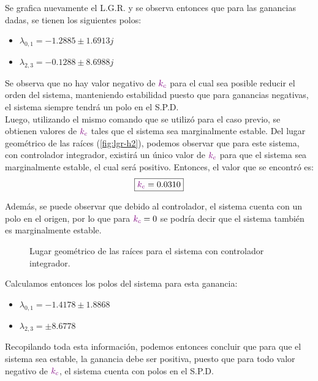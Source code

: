 Se grafica nuevamente el L.G.R. y se observa entonces que para las ganancias dadas,
se tienen los siguientes polos:
\begin{itemize}
    \item $\lambda_{0,1} = -1.2885 \pm 1.6913j$
    \item $\lambda_{2,3} = -0.1288 \pm 8.6988j$
\end{itemize}

Se observa que no hay valor negativo de $\mathbin{\color{violet}k_{c}}$ para el cual sea posible
reducir el orden del sistema, manteniendo estabilidad puesto que para ganancias
negativas, el sistema siempre tendrá un polo en el S.P.D. \\

Luego, utilizando el mismo comando que se utilizó para el caso previo, se obtienen
valores de $\mathbin{\color{violet}k_{c}}$ tales que el sistema sea marginalmente estable. Del lugar
geométrico de las raíces (\autoref{fig:lgr-h2}), podemos observar que para este sistema,
con controlador integrador, existirá un único valor de $\mathbin{\color{violet}k_{c}}$ para que
el sistema sea marginalmente estable, el cual será positivo. Entonces, el valor
que se encontró es:
\begin{equation}
    \boxed{\mathbin{\color{violet}k_{c}} = 0.0310}
\end{equation}

Además, se puede observar que debido al controlador, el sistema cuenta con un
polo en el origen, por lo que para $\mathbin{\color{violet}k_{c}} = 0$ se podría decir que el
sistema también es marginalmente estable.

\begin{figure}[ht]
    \centering
    
    \caption{Lugar geométrico de las raíces para el sistema con controlador integrador.}
    \label{fig:lgr-h2}
\end{figure}

Calculamos entonces los polos del sistema para esta ganancia:
\begin{itemize}
    \item $\lambda_{0,1} = -1.4178 \pm 1.8868$
    \item $\lambda_{2,3} = \pm 8.6778$ \\
\end{itemize}

Recopilando toda esta información, podemos entonces concluir que para que el
sistema sea estable, la ganancia debe ser positiva, puesto que para todo valor
negativo de $\mathbin{\color{violet}k_{c}}$, el sistema cuenta con polos en el S.P.D.

